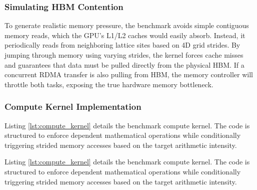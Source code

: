 \documentclass[twocolumn, secnumarabic, amssymb, nobibnotes, aps, prd, amsmath, nofootinbib]{revtex4-2}
\begin{document}
\subsubsection{Simulating HBM Contention}
To generate realistic memory pressure, the benchmark avoids simple contiguous memory reads, which the GPU's L1/L2 caches would easily absorb. Instead, it periodically reads from neighboring lattice sites based on 4D grid strides. By jumping through memory using varying strides, the kernel forces cache misses and guarantees that data must be pulled directly from the physical HBM. If a concurrent RDMA transfer is also pulling from HBM, the memory controller will throttle both tasks, exposing the true hardware memory bottleneck.

\subsubsection{Compute Kernel Implementation}
Listing \ref{lst:compute_kernel} details the benchmark compute kernel. The code is structured to enforce dependent mathematical operations while conditionally triggering strided memory accesses based on the target arithmetic intensity.

Listing \ref{lst:compute_kernel} details the benchmark compute kernel. The code is structured to enforce dependent mathematical operations while conditionally triggering strided memory accesses based on the target arithmetic intensity.
\end{document}

